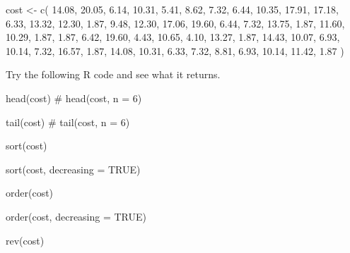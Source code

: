 \documentclass[
  letterpaper,
  DIV=11,
  numbers=noendperiod]{scrreprt}
\newenvironment{Shaded}{\begin{snugshade}}{\end{snugshade}}
\newcommand{\AttributeTok}[1]{\textcolor[rgb]{0.40,0.45,0.13}{#1}}
\newcommand{\CommentTok}[1]{\textcolor[rgb]{0.37,0.37,0.37}{#1}}
\newcommand{\ConstantTok}[1]{\textcolor[rgb]{0.56,0.35,0.01}{#1}}
\newcommand{\FloatTok}[1]{\textcolor[rgb]{0.68,0.00,0.00}{#1}}
\newcommand{\FunctionTok}[1]{\textcolor[rgb]{0.28,0.35,0.67}{#1}}
\newcommand{\NormalTok}[1]{\textcolor[rgb]{0.00,0.23,0.31}{#1}}
\newcommand{\OtherTok}[1]{\textcolor[rgb]{0.00,0.23,0.31}{#1}}
\begin{document}
\begin{Shaded}
\begin{Highlighting}[]
\NormalTok{cost }\OtherTok{\textless{}{-}} \FunctionTok{c}\NormalTok{(}
  \FloatTok{14.08}\NormalTok{, }\FloatTok{20.05}\NormalTok{, }\FloatTok{6.14}\NormalTok{, }\FloatTok{10.31}\NormalTok{, }\FloatTok{5.41}\NormalTok{, }\FloatTok{8.62}\NormalTok{, }\FloatTok{7.32}\NormalTok{,}
  \FloatTok{6.44}\NormalTok{, }\FloatTok{10.35}\NormalTok{, }\FloatTok{17.91}\NormalTok{, }\FloatTok{17.18}\NormalTok{, }\FloatTok{6.33}\NormalTok{, }\FloatTok{13.32}\NormalTok{, }\FloatTok{12.30}\NormalTok{, }\FloatTok{1.87}\NormalTok{,}
  \FloatTok{9.48}\NormalTok{, }\FloatTok{12.30}\NormalTok{, }\FloatTok{17.06}\NormalTok{, }\FloatTok{19.60}\NormalTok{, }\FloatTok{6.44}\NormalTok{, }\FloatTok{7.32}\NormalTok{, }\FloatTok{13.75}\NormalTok{, }\FloatTok{1.87}\NormalTok{,}
  \FloatTok{11.60}\NormalTok{, }\FloatTok{10.29}\NormalTok{, }\FloatTok{1.87}\NormalTok{, }\FloatTok{1.87}\NormalTok{, }\FloatTok{6.42}\NormalTok{, }\FloatTok{19.60}\NormalTok{, }\FloatTok{4.43}\NormalTok{, }\FloatTok{10.65}\NormalTok{,}
  \FloatTok{4.10}\NormalTok{, }\FloatTok{13.27}\NormalTok{, }\FloatTok{1.87}\NormalTok{, }\FloatTok{14.43}\NormalTok{, }\FloatTok{10.07}\NormalTok{, }\FloatTok{6.93}\NormalTok{, }\FloatTok{10.14}\NormalTok{, }\FloatTok{7.32}\NormalTok{,}
  \FloatTok{16.57}\NormalTok{, }\FloatTok{1.87}\NormalTok{, }\FloatTok{14.08}\NormalTok{, }\FloatTok{10.31}\NormalTok{, }\FloatTok{6.33}\NormalTok{, }\FloatTok{7.32}\NormalTok{, }\FloatTok{8.81}\NormalTok{, }\FloatTok{6.93}\NormalTok{,}
  \FloatTok{10.14}\NormalTok{, }\FloatTok{11.42}\NormalTok{, }\FloatTok{1.87}
\NormalTok{)}
\end{Highlighting}
\end{Shaded}

Try the following R code and see what it returns.

\begin{Shaded}
\begin{Highlighting}[]
\FunctionTok{head}\NormalTok{(cost)    }\CommentTok{\# head(cost, n = 6)}

\FunctionTok{tail}\NormalTok{(cost)    }\CommentTok{\# tail(cost, n = 6)}

\FunctionTok{sort}\NormalTok{(cost)}

\FunctionTok{sort}\NormalTok{(cost, }\AttributeTok{decreasing =} \ConstantTok{TRUE}\NormalTok{)}

\FunctionTok{order}\NormalTok{(cost)}

\FunctionTok{order}\NormalTok{(cost, }\AttributeTok{decreasing =} \ConstantTok{TRUE}\NormalTok{)}

\FunctionTok{rev}\NormalTok{(cost)}
\end{Highlighting}
\end{Shaded}
\end{document}
